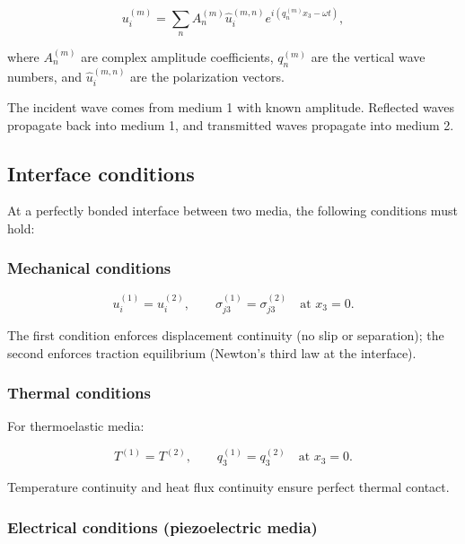 \begin{equation}
u_i^{(m)} = \sum_n A_n^{(m)} \hat{u}_i^{(m,n)} e^{i(q_n^{(m)}x_3 - \omega t)},
\label{eq:9.2}
\end{equation}

where $A_n^{(m)}$ are complex amplitude coefficients, $q_n^{(m)}$ are the vertical wave numbers, and $\hat{u}_i^{(m,n)}$ are the polarization vectors.

The incident wave comes from medium 1 with known amplitude. Reflected waves propagate back into medium 1, and transmitted waves propagate into medium 2.

\subsection{Interface conditions}
\label{sec:9.3}

At a perfectly bonded interface between two media, the following conditions must hold:

\subsubsection{Mechanical conditions}

\begin{equation}
u_i^{(1)} = u_i^{(2)}, \qquad \sigma_{j3}^{(1)} = \sigma_{j3}^{(2)} \quad \text{at } x_3 = 0.
\label{eq:9.3}
\end{equation}

The first condition enforces displacement continuity (no slip or separation); the second enforces traction equilibrium (Newton's third law at the interface).

\subsubsection{Thermal conditions}

For thermoelastic media:

\begin{equation}
T^{(1)} = T^{(2)}, \qquad q_3^{(1)} = q_3^{(2)} \quad \text{at } x_3 = 0.
\label{eq:9.4}
\end{equation}

Temperature continuity and heat flux continuity ensure perfect thermal contact.

\subsubsection{Electrical conditions (piezoelectric media)}

